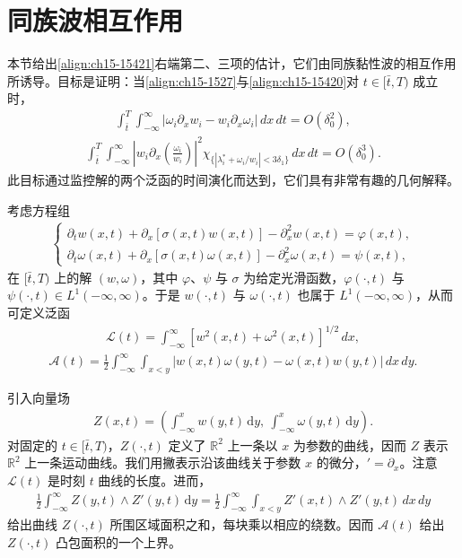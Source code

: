 \documentclass[../../main.tex]{subfiles}
\begin{document}
\section{同族波相互作用}\label{section:ch15-同族波相互作用}

本节给出\eqref{align:ch15-15421}右端第二、三项的估计，它们由同族黏性波的相互作用所诱导。目标是证明：当\eqref{align:ch15-1527}与\eqref{align:ch15-15420}对 $t\in[\bar t,T)$ 成立时，
\begin{align}
\int_{\bar t}^{T}\int_{-\infty}^{\infty}|\omega_i\partial_xw_i-w_i\partial_x\omega_i|\,dx\,dt=O(\delta_0^2),
\label{align:ch15-1561}
\end{align}
\begin{align}
\int_{\bar t}^{T}\int_{-\infty}^{\infty}\left|w_i\partial_x\left(\frac{\omega_i}{w_i}\right)\right|^2\chi_{\{|\lambda_i^*+\omega_i/w_i|<3\delta_1\}}\,dx\,dt=O(\delta_0^3).
\label{align:ch15-1562}
\end{align}
此目标通过监控解的两个泛函的时间演化而达到，它们具有非常有趣的几何解释。

考虑方程组
\begin{align}
\begin{cases}
\partial_tw(x,t)+\partial_x\left[\sigma(x,t)w(x,t)\right]-\partial_x^2w(x,t)=\varphi(x,t),\\
\partial_t\omega(x,t)+\partial_x\left[\sigma(x,t)\omega(x,t)\right]-\partial_x^2\omega(x,t)=\psi(x,t),
\end{cases}
\label{align:ch15-1563}
\end{align}
在 $[\bar t,T)$ 上的解 $(w,\omega)$，其中 $\varphi$、$\psi$ 与 $\sigma$ 为给定光滑函数，$\varphi(\cdot,t)$ 与 $\psi(\cdot,t)\in L^1(-\infty,\infty)$。于是 $w(\cdot,t)$ 与 $\omega(\cdot,t)$ 也属于 $L^1(-\infty,\infty)$，从而可定义泛函
\begin{align}
\mathscr{L}(t)=\int_{-\infty}^{\infty}\left[w^2(x,t)+\omega^2(x,t)\right]^{1/2}\,dx,
\label{align:ch15-1564}
\end{align}
\begin{align}
\mathscr{A}(t)=\frac12\int_{-\infty}^{\infty}\int_{x<y}|w(x,t)\omega(y,t)-\omega(x,t)w(y,t)|\,dx\,dy.
\label{align:ch15-1565}
\end{align}

引入向量场
\begin{align}
Z(x,t)=\left(\int_{-\infty}^xw(y,t)\,\mathrm{d}y,\ \int_{-\infty}^x\omega(y,t)\,\mathrm{d}y\right).
\label{align:ch15-1566}
\end{align}
对固定的 $t\in[\bar t,T)$，$Z(\cdot,t)$ 定义了 $\mathbb{R}^2$ 上一条以 $x$ 为参数的曲线，因而 $Z$ 表示 $\mathbb{R}^2$ 上一条运动曲线。我们用撇表示沿该曲线关于参数 $x$ 的微分，$'=\partial_x$。注意 $\mathscr{L}(t)$ 是时刻 $t$ 曲线的长度。进而，
\begin{align}
\frac12\int_{-\infty}^{\infty}Z(y,t)\wedge Z'(y,t)\,\mathrm{d}y=\frac12\int_{-\infty}^{\infty}\int_{x<y}Z'(x,t)\wedge Z'(y,t)\,dx\,dy
\label{align:ch15-1567}
\end{align}
给出曲线 $Z(\cdot,t)$ 所围区域面积之和，每块乘以相应的绕数。因而 $\mathscr{A}(t)$ 给出 $Z(\cdot,t)$ 凸包面积的一个上界。
\end{document}
